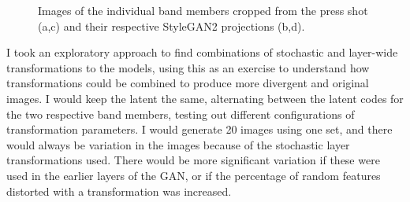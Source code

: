 \begin{figure}[!htbp]
    \hfill
    \hfill
    \hfill
    \caption[0171 headshots cropped and projected into StyleGAN latent space]{Images of the individual band members cropped from the press shot (a,c) and their respective StyleGAN2 projections (b,d). }
    \label{fig:c7:0171-crop-embed}
 \end{figure}

I took an exploratory approach to find combinations of stochastic and layer-wide transformations to the models, using this as an exercise to understand how transformations could be combined to produce more divergent and original images. 
I would keep the latent the same, alternating between the latent codes for the two respective band members, testing out different configurations of transformation parameters. 
I would generate 20 images using one set, and there would always be variation in the images because of the stochastic layer transformations used. 
There would be more significant variation if these were used in the earlier layers of the GAN, or if the percentage of random features distorted with a transformation was increased.

